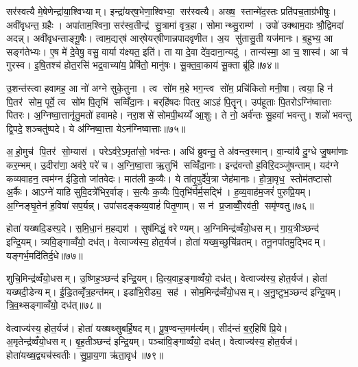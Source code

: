 सर॑स्वत्यै मे॒षेणेन्द्रा॑या॒श्विभ्याम्। इन्द्रा॑यर्‌ष॒भेणा॒श्विभ्या॒ सर॑स्वत्यै। अख्ष॒ स्तान्मे॑द॒स्तः प्रति॑पच॒ताग्र॑भीषुः। अवी॑वृधन्त॒ ग्रहैः। अपा॑ताम॒श्विना॒ सर॑स्व॒तीन्द्र॑ सु॒त्रामा॑ वृत्र॒हा। सोमान्थ्सु॒राम्ण॑। उपो॑ उक्थाम॒दाः श्रौ॒द्विमदा॑ अदन्न्। अवी॑वृधन्ताङ्गू॒षैः। त्वाम॒द्यर्‌ष॑ आर्‌षेयर्‌षीणान्नपादवृणीत। अ॒य सु॑तासु॒ती यज॑मानः। ब॒हुभ्य॒ आ सङ्ग॑तेभ्यः। ए॒ष मे॑ दे॒वेषु॒ वसु॒ वार्या य॑क्ष्यत॒ इति॑। ता या दे॒वा दे॑व॒दाना॒न्यदु॑। तान्य॑स्मा॒ आ च॒ शास्व॑। आ च॑ गुरस्व। इ॒षि॒तश्च॑ होत॒रसि॑ भद्र॒वाच्या॑य॒ प्रेषि॑तो॒ मानु॑षः। सू॒क्त॒वा॒काय॑ सू॒क्ता ब्रू॑हि॥७४॥\anuvakamend[इन्द्रा॑य॒ यज॑मानः स॒प्त च॑]

उ॒शन्त॑स्त्वा हवामह॒ आ नो॑ अग्ने सुके॒तुना। त्व सो॑म म॒हे भग॒न्त्व सो॑म॒ प्रचि॑कितो मनी॒षा। त्वया॒ हि न॑ पि॒तर॑ सोम॒ पूर्वे॒ त्व सो॑म पि॒तृभि॑ सव्विँदा॒नः। बर्‌हि॑षदः पितर॒ आऽहं पि॒तॄन्। उप॑हूताः पि॒तरोऽग्नि॑ष्वात्ताः पितरः। अ॒ग्निष्वा॒त्तानृ॑तु॒मतो॑ हवामहे। नरा॒शसे॑ सोमपी॒थय्यँ आ॒शुः। ते नो॒ अर्व॑न्तः सु॒हवा॑ भवन्तु। शन्नो॑ भवन्तु द्वि॒पदे॒ शञ्चतु॑ष्पदे। ये अ॑ग्निष्वा॒त्ता येऽन॑ग्निष्वात्ताः॥७५॥

अ॒हो॒मुच॑ पि॒तर॑ सो॒म्यास॑। परेऽव॑रे॒ऽमृता॑सो॒ भव॑न्तः। अधि॑ ब्रुवन्तु॒ ते अ॑वन्त्व॒स्मान्। वा॒न्या॑यै दु॒ग्धे जु॒षमा॑णाः कर॒म्भम्। उ॒दीरा॑णा॒ अव॑रे॒ परे॑ च। अ॒ग्नि॒ष्वा॒त्ता ऋ॒तुभि॑ सव्विँदा॒नाः। इन्द्र॑वन्तो ह॒विरि॒दञ्जु॑षन्ताम्। यद॑ग्ने कव्यवाहन॒ त्वम॑ग्न ईडि॒तो जा॑तवेदः। मात॑ली क॒व्यैः। ये ता॑तृ॒पुर्दे॑व॒त्रा जेह॑मानाः। हो॒त्रा॒वृध॒ स्तोम॑तष्टासो अ॒र्कैः। आऽग्ने॑ याहि सुवि॒दत्रे॑भिर॒र्वाङ्। स॒त्यैः क॒व्यैः पि॒तृभि॑र्घर्म॒सद्भि॑। ह॒व्य॒वाह॑म॒जरं॑ पुरुप्रि॒यम्। अ॒ग्निङ्घृ॒तेन॑ ह॒विषा॑ सप॒र्यन्न्। उपा॑सदङ्कव्य॒वाहं॑ पितृ॒णाम्। स न॑ प्र॒जाव्वीँ॒रव॑ती॒ समृ॑ण्वतु॥७६॥\anuvakamend[अन॑ग्निष्वात्ता॒ जेह॑मानाः स॒प्त च॑]

होता॑ यख्षदि॒डस्प॒दे। स॒मि॒धा॒नं म॒हद्यश॑। सुष॑मिद्धं॒ वरेण्यम्। अ॒ग्निमिन्द्र॑व्वँयो॒धसम्। गा॒य॒त्रीञ्छन्द॑ इन्द्रि॒यम्। त्र्यवि॒ङ्गाव्वँयो॒ दध॑त्। वेत्वाज्य॑स्य॒ होत॒र्यज॑। होता॑ यख्ष॒च्छुचि॑व्रतम्। तनू॒नपा॑तमु॒द्भिदम्। यङ्गर्भ॒मदि॑तिर्द॒धे॥७७॥

शुचि॒मिन्द्र॑व्वँयो॒धसम्। उ॒ष्णिह॒ञ्छन्द॑ इन्द्रि॒यम्। दि॒त्य॒वाह॒ङ्गाव्वँयो॒ दध॑त्। वेत्वाज्य॑स्य॒ होत॒र्यज॑। होता॑ यख्षदी॒डेन्यम्। ई॒डि॒तव्वृँ॑त्र॒हन्त॑मम्। इडा॑भि॒रीड्य॒ सह॑। सोम॒मिन्द्र॑व्वँयो॒धसम्। अ॒नु॒ष्टुभ॒ञ्छन्द॑ इन्द्रि॒यम्। त्रि॒व॒थ्सङ्गाव्वँयो॒ दध॑त्॥७८॥

वेत्वाज्य॑स्य॒ होत॒र्यज॑। होता॑ यख्षथ्सुबर्\mbox{}हि॒षदम्। पू॒ष॒ण्वन्त॒मम॑र्त्यम्। सीद॑न्तं ब॒र्॒हिषि॑ प्रि॒ये। अ॒मृतेन्द्र॑व्वँयो॒धसम्। बृ॒ह॒तीञ्छन्द॑ इन्द्रि॒यम्। पञ्चा॑वि॒ङ्गाव्वँयो॒ दध॑त्। वेत्वाज्य॑स्य॒ होत॒र्यज॑। होता॑यख्ष॒द्व्यच॑स्वतीः। सु॒प्रा॒य॒णा ऋ॑ता॒वृध॑॥७९॥


